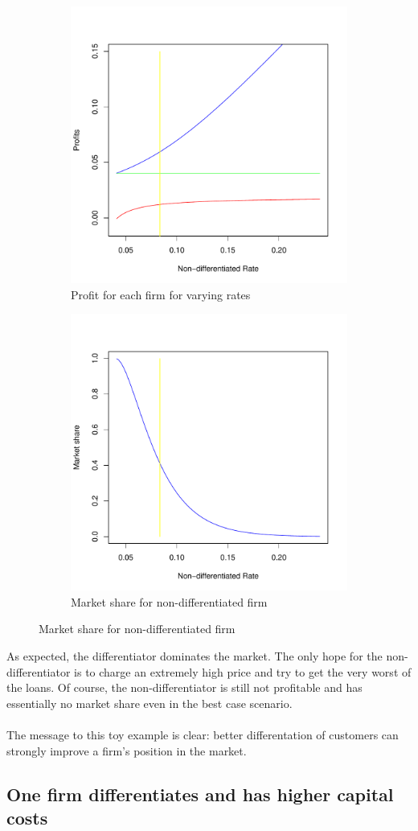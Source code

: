 \documentclass{article}
\theoremstyle{definition}
\begin{document}
\begin{figure}
\centering
\begin{subfigure}{.5\textwidth}
  \centering
 \includegraphics[width=0.5\linewidth]{LoanPricing-fig1plot}

  
  \caption{Profit for each firm for varying rates}
\end{subfigure}%
\begin{subfigure}{.5\textwidth}
  \centering
  \includegraphics[width=0.5\linewidth]{LoanPricing-fig2plot}
  \caption{Market share for non-differentiated firm}
\end{subfigure}
\end{figure}

As expected, the differentiator dominates the market.  The only hope for the non-differentiator is to charge an extremely high price and try to get the very worst of the loans.  Of course, the non-differentiator is still not profitable and has essentially no market share even in the best case scenario.  
\\
\\
The message to this toy example is clear: better differentation of customers can strongly improve a firm's position in the market.  

\subsection{One firm differentiates and has higher capital costs}
\end{document}
